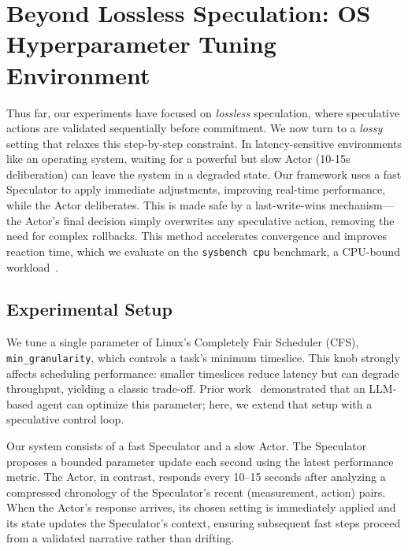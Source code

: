 \section{Beyond Lossless Speculation: OS Hyperparameter Tuning Environment}
\label{sec:os-speculation}

Thus far, our experiments have focused on \emph{lossless} speculation, where speculative actions are validated sequentially before commitment. We now turn to a \emph{lossy} setting that relaxes this step-by-step constraint.
In latency-sensitive environments like an operating system, 
waiting for a powerful but slow Actor (10-15s deliberation) can leave the system in a degraded state.
Our framework uses a fast Speculator to apply immediate adjustments, 
improving real-time performance, while the Actor deliberates. 
This is made safe by a last-write-wins mechanism—the Actor's final decision 
simply overwrites any speculative action, 
removing the need for complex rollbacks. 
This method accelerates convergence and improves reaction time, 
which we evaluate on the \texttt{sysbench cpu} benchmark, a CPU-bound workload~\citep{sysbench}.

\subsection{Experimental Setup}

We tune a single parameter of Linux's Completely Fair Scheduler (CFS), \texttt{min\_granularity}, 
which controls a task's minimum timeslice. 
This knob strongly affects scheduling performance: smaller timeslices reduce latency but can degrade throughput, yielding a classic trade-off. Prior work~\citep{liargkovas2025llmTuning} demonstrated that an LLM-based agent can optimize this parameter; here, we extend that setup with a speculative control loop.

Our system consists of a fast Speculator and a slow Actor. 
The Speculator proposes a bounded parameter update each second using the latest performance metric. 
The Actor, in contrast, responds every 10–15 seconds after analyzing a compressed chronology of the Speculator's recent (measurement, action) pairs.
When the Actor's response arrives, its chosen setting is immediately applied and its state updates the Speculator's context, 
ensuring subsequent fast steps proceed from a validated narrative rather than drifting. 
\vspace{-3pt}
